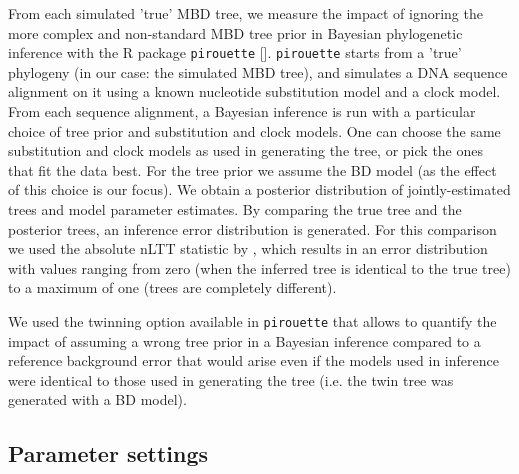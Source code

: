 From each simulated 'true' MBD tree, we measure the impact of
ignoring the more complex and non-standard MBD tree prior in
Bayesian phylogenetic inference with the R package \verb;pirouette; [\citep{pirouette}].
 \verb;pirouette; starts from a 'true'  phylogeny (in our case: the simulated MBD tree), and simulates a DNA sequence alignment on it using a known nucleotide substitution model and a clock model. 
From each sequence alignment, a Bayesian inference is run with a particular choice of tree prior and substitution and clock models. One can choose the same substitution and clock models as used in generating the tree, or pick the ones that fit the data best. For the tree prior we assume the BD model (as the effect of this choice is our focus). We obtain a posterior distribution of jointly-estimated trees and model parameter estimates.
By comparing the true tree and the posterior trees, an inference error distribution is generated. For this comparison we used the absolute nLTT statistic by \citet{janzen2015}, which results in an error distribution with values ranging from zero (when the inferred tree is identical to the true tree) to a maximum of one (trees are completely different).

We used the twinning option available in \verb;pirouette; that allows to quantify the impact of assuming a wrong tree prior in a Bayesian inference compared to a reference background error that would arise even if the models used in inference were identical to those used in generating the tree (i.e. the twin tree was generated with a BD model).


\subsection{Parameter settings}

